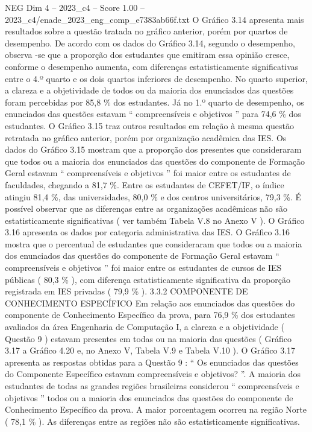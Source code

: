 \begin{textsample}{NEG Dim 4 – 2023\_c4 – Score 1.00 – 2023\_c4/enade\_2023\_eng\_comp\_e7383ab66f.txt}
O Gráfico 3.14 apresenta mais resultados sobre a questão tratada no gráfico anterior, porém por quartos de desempenho.
De acordo com os dados do Gráfico 3.14, segundo o desempenho, observa -se que a proporção dos estudantes que emitiram essa opinião cresce, conforme o desempenho aumenta, com diferenças estatisticamente significativas entre o 4.º quarto e os dois quartos inferiores de desempenho.
No quarto superior, a clareza e a objetividade de todos ou da maioria dos enunciados das questões foram percebidas por 85,8 \% dos estudantes.
Já no 1.º quarto de desempenho, os enunciados das questões estavam “ compreensíveis e objetivos ” para 74,6 \% dos estudantes.
O Gráfico 3.15 traz outros resultados em relação à mesma questão retratada no gráfico anterior, porém por organização acadêmica das IES.
Os dados do Gráfico 3.15 mostram que a proporção dos presentes que consideraram que todos ou a maioria dos enunciados das questões do componente de Formação Geral estavam “ compreensíveis e objetivos ” foi maior entre os estudantes de faculdades, chegando a 81,7 \%.
Entre os estudantes de CEFET/IF, o índice atingiu 81,4 \%, das universidades, 80,0 \% e dos centros universitários, 79,3 \%.
É possível observar que as diferenças entre as organizações acadêmicas não são estatisticamente significativas ( ver também Tabela V.8 no Anexo V ).
O Gráfico 3.16 apresenta os dados por categoria administrativa das IES.
O Gráfico 3.16 mostra que o percentual de estudantes que consideraram que todos ou a maioria dos enunciados das questões do componente de Formação Geral estavam “ compreensíveis e objetivos ” foi maior entre os estudantes de cursos de IES públicas ( 80,3 \% ), com diferença estatisticamente significativa da proporção registrada em IES privadas ( 79,9 \% ). 3.3.2 COMPONENTE DE CONHECIMENTO ESPECÍFICO Em relação aos enunciados das questões do componente de Conhecimento Específico da prova, para 76,9 \% dos estudantes avaliados da área Engenharia de Computação I, a clareza e a objetividade ( Questão 9 ) estavam presentes em todas ou na maioria das questões ( Gráfico 3.17 a Gráfico 4.20 e, no Anexo V, Tabela V.9 e Tabela V.10 ).
O Gráfico 3.17 apresenta as respostas obtidas para a Questão 9 : “ Os enunciados das questões do Componente Específico estavam compreensíveis e objetivos? ”.
A maioria dos estudantes de todas as grandes regiões brasileiras considerou “ compreensíveis e objetivos ” todos ou a maioria dos enunciados das questões do componente de Conhecimento Específico da prova.
A maior porcentagem ocorreu na região Norte ( 78,1 \% ).
As diferenças entre as regiões não são estatisticamente significativas.

\end{textsample}
